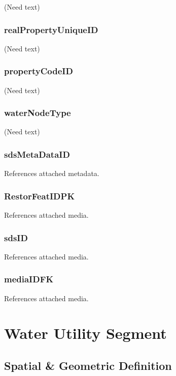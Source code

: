\documentclass[
  letterpaper,
  DIV=11,
  numbers=noendperiod]{scrreprt}
\begin{document}
(Need text)

\subsection{realPropertyUniqueID}\label{realpropertyuniqueid}

(Need text)

\subsection{propertyCodeID}\label{propertycodeid-4}

(Need text)

\subsection{waterNodeType}\label{waternodetype}

(Need text)

\subsection{sdsMetaDataID}\label{sdsmetadataid-25}

References attached metadata.

\subsection{RestorFeatIDPK}\label{restorfeatidpk-25}

References attached media.

\subsection{sdsID}\label{sdsid-25}

References attached media.

\subsection{mediaIDFK}\label{mediaidfk-23}

References attached media.

\chapter{Water Utility Segment}\label{water-utility-segment}

\section{Spatial \& Geometric
Definition}\label{spatial-geometric-definition-26}
\end{document}
